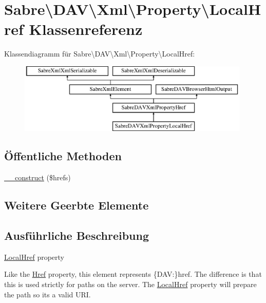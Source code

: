 \hypertarget{class_sabre_1_1_d_a_v_1_1_xml_1_1_property_1_1_local_href}{}\section{Sabre\textbackslash{}D\+AV\textbackslash{}Xml\textbackslash{}Property\textbackslash{}Local\+Href Klassenreferenz}
\label{class_sabre_1_1_d_a_v_1_1_xml_1_1_property_1_1_local_href}
Klassendiagramm für Sabre\textbackslash{}D\+AV\textbackslash{}Xml\textbackslash{}Property\textbackslash{}Local\+Href\+:\begin{figure}[H]
\begin{center}
\leavevmode
\includegraphics[height=3.348281cm]{class_sabre_1_1_d_a_v_1_1_xml_1_1_property_1_1_local_href}
\end{center}
\end{figure}
\subsection*{Öffentliche Methoden}
\begin{DoxyCompactItemize}
\item 
\mbox{\hyperlink{class_sabre_1_1_d_a_v_1_1_xml_1_1_property_1_1_local_href_a5aaa48ba1511601561f56140369e9136}{\+\_\+\+\_\+construct}} (\$hrefs)
\end{DoxyCompactItemize}
\subsection*{Weitere Geerbte Elemente}


\subsection{Ausführliche Beschreibung}
\mbox{\hyperlink{class_sabre_1_1_d_a_v_1_1_xml_1_1_property_1_1_local_href}{Local\+Href}} property

Like the \mbox{\hyperlink{class_sabre_1_1_d_a_v_1_1_xml_1_1_property_1_1_href}{Href}} property, this element represents \{D\+AV\+:\}href. The difference is that this is used strictly for paths on the server. The \mbox{\hyperlink{class_sabre_1_1_d_a_v_1_1_xml_1_1_property_1_1_local_href}{Local\+Href}} property will prepare the path so it\textquotesingle{}s a valid U\+RI.

